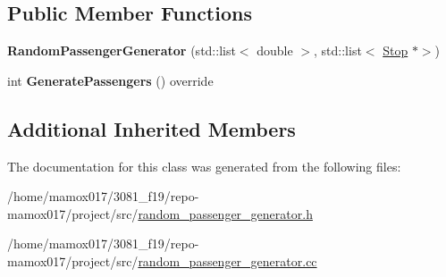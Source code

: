 \subsection*{Public Member Functions}
\begin{DoxyCompactItemize}
\item 
\mbox{\label{classRandomPassengerGenerator_a1be1b4abfe82bfe95eb0a078d9a3342d}} 
{\bfseries Random\+Passenger\+Generator} (std\+::list$<$ double $>$, std\+::list$<$ \hyperlink{classStop}{Stop} $\ast$$>$)
\item 
\mbox{\label{classRandomPassengerGenerator_aba2d80cde33371cf9c3d033f1b8ba6b8}} 
int {\bfseries Generate\+Passengers} () override
\end{DoxyCompactItemize}
\subsection*{Additional Inherited Members}


The documentation for this class was generated from the following files\+:\begin{DoxyCompactItemize}
\item 
/home/mamox017/3081\+\_\+f19/repo-\/mamox017/project/src/\hyperlink{random__passenger__generator_8h}{random\+\_\+passenger\+\_\+generator.\+h}\item 
/home/mamox017/3081\+\_\+f19/repo-\/mamox017/project/src/\hyperlink{random__passenger__generator_8cc}{random\+\_\+passenger\+\_\+generator.\+cc}\end{DoxyCompactItemize}
